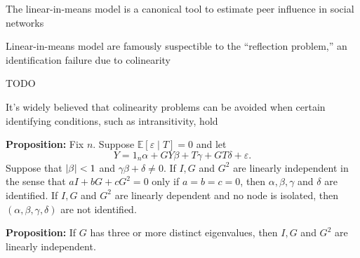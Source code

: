 \documentclass[final]{beamer}
\newlength{\colwidth}
\begin{document}
\begin{frame}[t]
\begin{columns}[t]
\begin{column}{\colwidth}
\begin{block}{The linear-in-means model is a canonical tool to estimate peer influence in social networks}
            \end{block}

            \begin{block}{Linear-in-means model are famously suspectible to the ``reflection problem,'' an identification failure due to colinearity}

                TODO

            \end{block}

            \begin{block}{It's widely believed that colinearity problems can be avoided when certain identifying conditions, such as intransitivity, hold}

                \textbf{Proposition:}
                Fix $n$. Suppose $\mathbb E[\varepsilon \mid T] = 0$ and let
                \begin{equation*}
                    Y = 1_n \alpha + G Y \beta + T \gamma + G T \delta + \varepsilon.
                \end{equation*}
                Suppose that $\lvert\beta\rvert < 1$ and $\gamma \beta + \delta \neq 0$.
                If $I, G$ and $G^2$ are linearly independent in the sense that $a I + b G + c G^2 = 0$ only if $a = b = c = 0$, then $\alpha, \beta, \gamma$ and $\delta$ are identified.
                If $I, G$ and $G^2$ are linearly dependent and no node is isolated, then $(\alpha, \beta, \gamma, \delta)$ are not identified.

                \textbf{Proposition:}
                If $G$ has three or more distinct eigenvalues, then $I, G$ and $G^2$ are linearly independent.

                \begin{figure}
                    \begin{minipage}{0.49\textwidth}
                        \centering
\end{minipage}
\end{figure}
\end{block}
\end{column}
\end{columns}
\end{frame}
\end{document}
